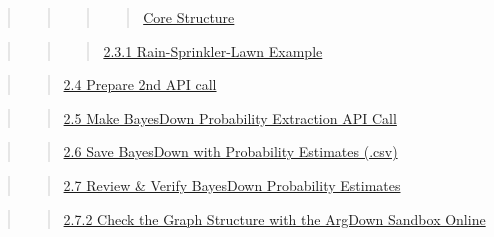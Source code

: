 \documentclass[
  11pt,
  letterpaper,
]{book}
\begin{document}
\begin{quote}
\begin{quote}
\begin{quote}
\begin{quote}
\hyperref[scrollTo=ivcnd2ml41Nvux26uniqifier=1]{Core Structure}
\end{quote}
\end{quote}
\end{quote}
\end{quote}

\begin{quote}
\begin{quote}
\begin{quote}
\hyperref[scrollTo=Fn72WmgVEOH0ux26uniqifier=1]{2.3.1
Rain-Sprinkler-Lawn Example}
\end{quote}
\end{quote}
\end{quote}

\begin{quote}
\begin{quote}
\hyperref[scrollTo=d4tB9WD-fIWZux26uniqifier=1]{2.4 Prepare 2nd API
call}
\end{quote}
\end{quote}

\begin{quote}
\begin{quote}
\hyperref[scrollTo=oPWto83lfN9Qux26uniqifier=1]{2.5 Make BayesDown
Probability Extraction API Call}
\end{quote}
\end{quote}

\begin{quote}
\begin{quote}
\hyperref[scrollTo=L8NWpz8MfZ9_ux26uniqifier=1]{2.6 Save BayesDown with
Probability Estimates (.csv)}
\end{quote}
\end{quote}

\begin{quote}
\begin{quote}
\hyperref[scrollTo=Q3PTtYgRfsLaux26uniqifier=1]{2.7 Review \& Verify
BayesDown Probability Estimates}
\end{quote}
\end{quote}

\begin{quote}
\begin{quote}
\hyperref[scrollTo=VwoAgBsafonhux26uniqifier=1]{2.7.2 Check the Graph
Structure with the ArgDown Sandbox Online}
\end{quote}
\end{quote}
\end{document}
